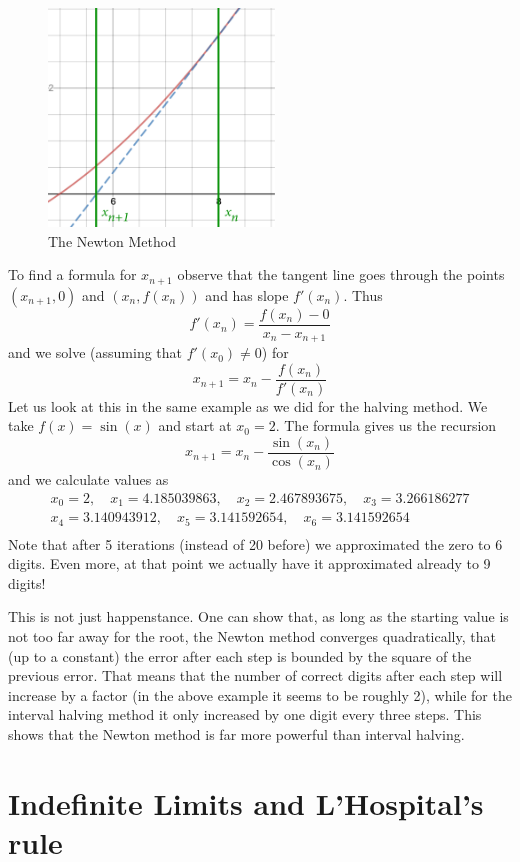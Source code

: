 \begin{figure}
\begin{center}
\includegraphics[width=6cm]{pic/newtonmeth.pdf}
\end{center}
\caption{The Newton Method}
\label{fignewtonm}
\end{figure}

To find a formula for $x_{n+1}$ observe that the tangent line goes through
the points $(x_{n+1},0)$ and $(x_n,f(x_n))$ and has slope $f'(x_n)$. Thus
\[
f'(x_n)=\frac{f(x_n)-0}{x_n-x_{n+1}}
\]
and we solve (assuming that $f'(x_0)\not=0$) for
\[
x_{n+1}=x_n-\frac{f(x_n)}{f'(x_n)}
\]
Let us look at this in the same example as we did for the halving method. We
take $f(x)=\sin(x)$ and start at $x_0=2$. The formula gives us the recursion
\[
x_{n+1}=x_n-\frac{\sin(x_n)}{\cos(x_n)}
\]
and we calculate values as
\begin{eqnarray*}
&x_0=2, \quad x_1=4.185039863,\quad x_2=2.467893675, \quad x_3=3.266186277&\\
&x_4=3.140943912, \quad x_5=3.141592654,\quad x_6=3.141592654&\\
\end{eqnarray*}
Note that after 5 iterations (instead of 20 before) we approximated the zero
to $6$ digits. Even more, at that point we actually have it approximated
already to 9 digits!

This is not just happenstance. One can show that, as long as the starting
value is not too far away for the root, the Newton method converges
quadratically, that (up to a constant) the error after each step is bounded
by the square of the previous error. That means that the number of correct
digits after each step will increase by a factor (in the above example it
seems to be roughly 2), while for the interval halving method it only
increased by one digit every three steps. This shows that the Newton
method is far more powerful than interval halving.

\section{Indefinite Limits and L'Hospital's rule}

